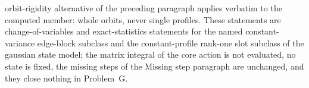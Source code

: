 orbit-rigidity alternative of the preceding paragraph applies verbatim to the computed member: whole orbits, never single profiles. These statements are change-of-variables and exact-statistics statements for the named constant-variance edge-block subclass and the constant-profile rank-one slot subclass of the gaussian state model; the matrix integral of the core action is not evaluated, no state is fixed, the missing steps of the Missing step paragraph are unchanged, and they close nothing in Problem~G.

